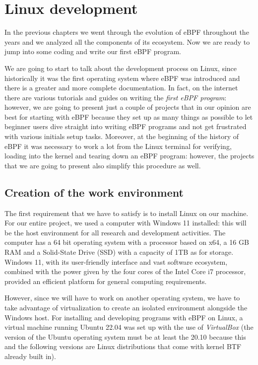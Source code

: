 \chapter{Linux development}

In the previous chapters we went through the evolution of eBPF throughout the years and we analyzed all the components of its ecosystem.
Now we are ready to jump into some coding and write our first eBPF program.

We are going to start to talk about the development process on Linux, since historically it was the first operating system where eBPF was introduced and there is a greater and more complete documentation.
In fact, on the internet there are various tutorials and guides on writing the \textit{first eBPF program}: however, we are going to present just a couple of projects that in our opinion are best for starting with eBPF because they set up as many things as possible to let beginner users dive straight into writing eBPF programs and not get frustrated with various initials setup tasks.
Moreover, at the beginning of the history of eBPF it was necessary to work a lot from the Linux terminal for verifying, loading into the kernel and tearing down an eBPF program: however, the projects that we are going to present also simplify this procedure as well.

\section{Creation of the work environment}

The first requirement that we have to satisfy is to install Linux on our machine.
For our entire project, we used a computer with Windows 11 installed: this will be the host environment for all research and development activities. 
The computer has a 64 bit operating system with a processor based on x64, a 16 GB RAM and a Solid-State Drive (SSD) with a capacity of 1TB as for storage.
Windows 11, with its user-friendly interface and vast software ecosystem, combined with the power given by the four cores of the Intel Core i7 processor, provided an efficient platform for general computing requirements.

However, since we will have to work on another operating system, we have to take advantage of virtualization to create an isolated environment alongside the Windows host.
For installing and developing programs with eBPF on Linux, a virtual machine running Ubuntu 22.04 was set up with the use of \textit{VirtualBox} (the version of the Ubuntu operating system must be at least the 20.10 because this and the following versions are Linux distributions that come with kernel BTF already built in).

